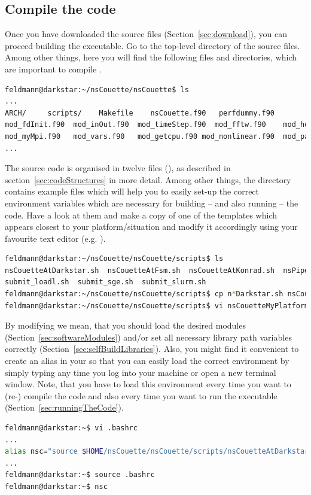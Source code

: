 \documentclass[a4paper, 11pt, DIV=11]{scrartcl}
\begin{document}
\subsection{Compile the code}
\label{sec:compile}

Once you have downloaded the source files (Section~\ref{sec:download}),
you can proceed building the executable. Go to the top-level directory
of the source files. Among other things, here you will find the following
files and directories, which are important to compile \nsc.
\begin{lstlisting}[language=bash]
feldmann@darkstar:~/nsCouette/nsCouette$ ls
...
ARCH/     scripts/    Makefile    nsCouette.f90   perfdummy.f90
mod_fdInit.f90  mod_inOut.f90  mod_timeStep.f90  mod_fftw.f90    mod_hdf5io.f90
mod_myMpi.f90   mod_vars.f90   mod_getcpu.f90 mod_nonlinear.f90  mod_params.f90
...
\end{lstlisting}
The source code is organised in twelve \fortran files (), as
described in section~\ref{sec:codeStructures} in more detail. Among other things,
the directory  contains example files which will help you
to easily set-up the correct environment variables which are necessary for
building -- and also running -- the code. Have a look at them and make a
copy of one of the templates which appears closest to your platform/situation
and modify it accordingly using your favourite text editor (e.g. ).
\begin{lstlisting}[language=bash]
feldmann@darkstar:~/nsCouette/nsCouette/scripts$ ls 
nsCouetteAtDarkstar.sh  nsCouetteAtFsm.sh  nsCouetteAtKonrad.sh  nsPipeAtKonrad.sh 
submit_loadl.sh  submit_sge.sh  submit_slurm.sh
feldmann@darkstar:~/nsCouette/nsCouette/scripts$ cp n*Darkstar.sh nsCouetteAtMyPlatform.sh
feldmann@darkstar:~/nsCouette/nsCouette/scripts$ vi nsCouetteMyPlatform.sh
\end{lstlisting}
By modifying we mean, that you should load the desired modules
(Section~\ref{sec:softwareModules}) and/or set all necessary
library path variables correctly (Section~\ref{sec:selfBuildLibraries}).
Also, you might find it convenient to create an alias in your
 so that you can easily load the correct environment
by simply typing  any time you log into your machine
or open a new terminal window. Note, that you have to load this
environment every time you want to (re-) compile the code and
also every time you want to run the executable (Section~\ref{sec:runningTheCode}).
\begin{lstlisting}[language=bash]
feldmann@darkstar:~$ vi .bashrc
...
alias nsc="source $HOME/nsCouette/nsCouette/scripts/nsCouetteAtDarkstar.sh"
...
feldmann@darkstar:~$ source .bashrc
feldmann@darkstar:~$ nsc
\end{lstlisting}
\end{document}
